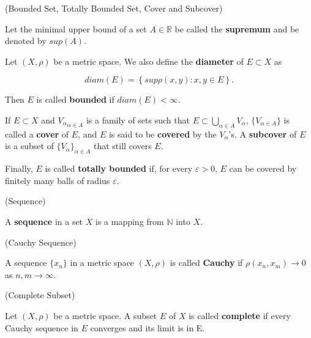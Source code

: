\begin{definition}{(Bounded Set, Totally Bounded Set, Cover and Subcover) \cite{folland2013real}}

Let the minimal upper bound of a set $A \in \mathbb{R}$ be called the \textbf{supremum} and be denoted by $sup(A)$. 

Let $(X, \rho)$ be a metric space. We also define the \textbf{diameter} of $E \subset X$ as

\[ diam(E) = \left\{sup \rho(x,y): x,y \in E \right\}. \]

\vspace{0.05in}

\noindent Then $E$ is called \textbf{bounded} if $diam(E) < \infty$. 

If $E \subset X$ and ${V_{\alpha}}_{\alpha \in A}$ is a family of sets
such that $E \subset \bigcup_{\alpha \in A}V_{\alpha}$, $\{V_{\alpha \in A}\}$ is called
a \textbf{cover} of $E$, and $E$ is said to be \textbf{covered} by the $V_{\alpha}$'s. A 
\textbf{subcover} of $E$ is a subset of $\{V_{\alpha}\}_{\alpha \in A}$ that still covers $E$.

Finally, $E$ is called \textbf{totally bounded} if, for every $\varepsilon > 0$, $E$ can be covered by
finitely many balls of radius $\varepsilon$.

\end{definition}
\vspace{0.1in}

\begin{definition}{(Sequence) \cite{folland2013real}}

A \textbf{sequence} in a set $X$ is a mapping from $\mathbb{N}$ into $X$.

\end{definition}
\vspace{0.1in}

\begin{definition}{(Cauchy Sequence) \cite{folland2013real}}

A sequence $\{x_{n}\}$ in a metric space $(X, \rho)$ is called \textbf{Cauchy} if 
$\rho(x_{n},x_{m}) \rightarrow 0$ as $n,m \rightarrow \infty$.

\end{definition}
\vspace{0.1in}

\begin{definition}{(Complete Subset) \cite{folland2013real}}

Let $(X,\rho)$ be a metric space. A subset $E$ of $X$ is called \textbf{complete} if
every Cauchy sequence in $E$ converges and its limit is in E.

\end{definition}
\vspace{0.1in}

